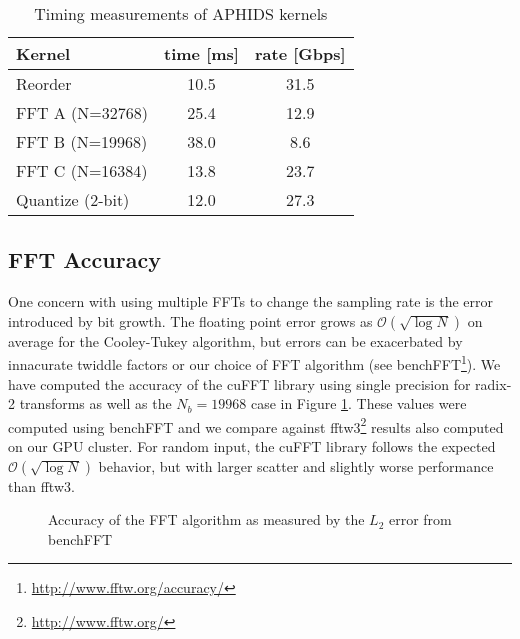 \begin{table}
\begin{center}
\caption{Timing measurements of APHIDS kernels \label{tab:kernel_times}}
\begin{threeparttable}
\begin{tabular}{l|cc}
\toprule
Kernel & time [ms] & rate [Gbps] \\
\midrule
Reorder                & 10.5 & 31.5 \\
FFT A (N=32768)        & 25.4 & 12.9 \\
FFT B (N=19968)        & 38.0 & 8.6  \\
FFT C (N=16384)        & 13.8 & 23.7 \\
Quantize (2-bit)       & 12.0 & 27.3 \\
\bottomrule
\end{tabular}
\end{threeparttable}
\end{center}
\end{table}

\subsection{FFT Accuracy}
One concern with using multiple FFTs to change the sampling rate is the error introduced by bit growth.  The 
floating point error grows as $\mathcal{O}(\sqrt{\log{N}})$ \citep{schatzman96} on average for the Cooley-Tukey
algorithm, but errors can be exacerbated by innacurate twiddle factors or our choice of FFT algorithm (see
benchFFT\footnote{\url{http://www.fftw.org/accuracy/}}).  We have computed the accuracy of the cuFFT library 
using single precision for 
radix-2 transforms as well as the $N_b = 19968$ case in Figure \ref{fig:fft_accuracy}.  These values 
were computed using benchFFT and we compare against fftw3\footnote{\url{http://www.fftw.org/}}
results also computed on our GPU cluster.  For random input, the cuFFT library follows the expected 
$\mathcal{O}(\sqrt{\log{N}})$ behavior, but with larger scatter and slightly worse performance than fftw3.

\begin{figure}[t]
\caption{Accuracy of the FFT algorithm as measured by the $L_2$ error from benchFFT} \label{fig:fft_accuracy}
\end{figure}


